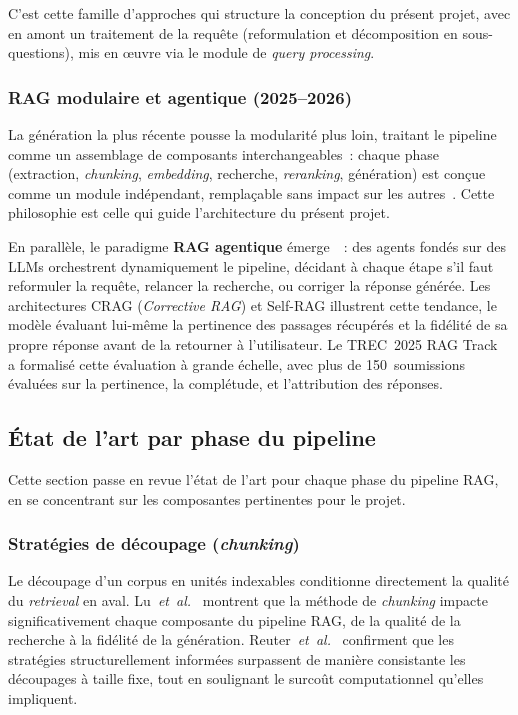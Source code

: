 \documentclass[11pt,a4paper]{article}
\begin{document}
C'est cette famille d'approches qui structure la conception du présent projet, avec en amont un traitement de la requête (reformulation et décomposition en sous-questions), mis en \oe{}uvre via le module de \textit{query processing}.

\subsubsection{RAG modulaire et agentique (2025--2026)}

La génération la plus récente pousse la modularité plus loin, traitant le pipeline comme un assemblage de composants interchangeables~: chaque phase (extraction, \textit{chunking}, \textit{embedding}, recherche, \textit{reranking}, génération) est conçue comme un module indépendant, remplaçable sans impact sur les autres~\cite{gao2024ragsurvey}. Cette philosophie est celle qui guide l'architecture du présent projet.

En parallèle, le paradigme \textbf{RAG agentique} émerge~\cite{singh2025agenticrag}~: des agents fondés sur des LLMs orchestrent dynamiquement le pipeline, décidant à chaque étape s'il faut reformuler la requête, relancer la recherche, ou corriger la réponse générée. Les architectures CRAG (\textit{Corrective RAG}) et Self-RAG illustrent cette tendance, le modèle évaluant lui-même la pertinence des passages récupérés et la fidélité de sa propre réponse avant de la retourner à l'utilisateur. Le TREC~2025 RAG Track~\cite{trec2025rag} a formalisé cette évaluation à grande échelle, avec plus de 150~soumissions évaluées sur la pertinence, la complétude, et l'attribution des réponses.

\subsection{État de l'art par phase du pipeline}
\label{sec:etat-art-phases}

Cette section passe en revue l'état de l'art pour chaque phase du pipeline RAG, en se concentrant sur les composantes pertinentes pour le projet.

\subsubsection{Stratégies de découpage (\textit{chunking})}

Le découpage d'un corpus en unités indexables conditionne directement la qualité du \textit{retrieval} en aval. Lu~\textit{et~al.}~\cite{lu2025hichunk} montrent que la méthode de \textit{chunking} impacte significativement chaque composante du pipeline RAG, de la qualité de la recherche à la fidélité de la génération. Reuter~\textit{et~al.}~\cite{reuter2026chunking} confirment que les stratégies structurellement informées surpassent de manière consistante les découpages à taille fixe, tout en soulignant le surcoût computationnel qu'elles impliquent.
\end{document}
